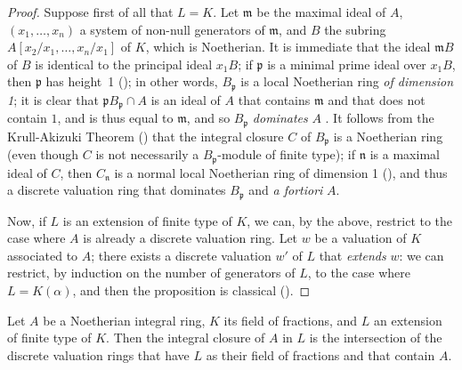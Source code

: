 \begin{proof}
Suppose first of all that $L=K$.
Let $\mathfrak{m}$ be the maximal ideal of $A$, $(x_1,\ldots,x_n)$ a system of non-null generators of $\mathfrak{m}$, and $B$ the subring $A[x_2/x_1,\ldots,x_n/x_1]$ of $K$, which is Noetherian.
It is immediate that the ideal $\mathfrak{m}B$ of $B$ is identical to the principal ideal $x_1B$;
if $\mathfrak{p}$ is a minimal prime ideal over $x_1B$, then $\mathfrak{p}$ has height~1 (\cite[t.~I, p.~277]{I-13});
in other words, $B_\mathfrak{p}$ is a local Noetherian ring \emph{of dimension 1};
it is clear that $\mathfrak{p}B_\mathfrak{p}\cap A$ is an ideal of $A$ that contains $\mathfrak{m}$ and that does not contain $1$, and is thus equal to $\mathfrak{m}$, and so $B_\mathfrak{p}$ \emph{dominates} $A$ .
It follows from the Krull-Akizuki Theorem (\cite[p.~293]{II-25}) that the integral closure $C$ of $B_\mathfrak{p}$ is a Noetherian ring (even though $C$ is not necessarily a $B_\mathfrak{p}$-module of finite type);
if $\mathfrak{n}$ is a maximal ideal of $C$, then $C_\mathfrak{n}$ is a normal local Noetherian ring of dimension 1 (\cite[p.~295]{II-25}), and thus a discrete valuation ring that dominates $B_\mathfrak{p}$ and \emph{a fortiori} $A$.

Now, if $L$ is an extension of finite type of $K$, we can, by the above, restrict to the case where $A$ is already a discrete valuation ring.
Let $w$ be a valuation of $K$ associated to $A$;
there exists a discrete valuation $w'$ of $L$ that \emph{extends} $w$: we can restrict, by induction on the number of generators of $L$, to the case where $L=K(\alpha)$, and then the proposition is classical (\cite[p.~106]{II-24}).
\end{proof}

\begin{corollary}[7.1.8]
\label{II.7.1.8}
Let $A$ be a Noetherian integral ring, $K$ its field of fractions, and $L$ an extension of finite type of $K$.
Then the integral closure of $A$ in $L$ is the intersection of the discrete valuation rings that have $L$ as their field of fractions and that contain $A$.
\end{corollary}


